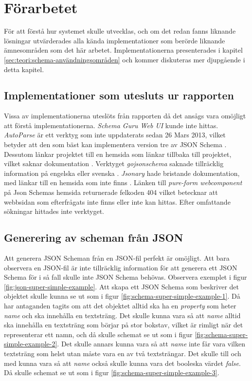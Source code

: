 \chapter{Förarbetet}
\label{sec:forarbete}
För att förstå hur systemet skulle utvecklas, och om det redan fanns liknande lösningar utvärderades alla kända implementationer som berörde liknande ämnesområden som det här arbetet. Implementationerna presenterades i kapitel \ref{sec:teori:schema-användningsområden} och kommer diskuteras mer djupgående i detta kapitel.

\section{Implementationer som utesluts ur rapporten}
Vissa av implementationerna uteslöts från rapporten då det ansågs vara omöjligt att förstå implementationerna. \textit{Schema Guru Web UI} kunde inte hittas. \textit{AutoParse} är ett verktyg som inte uppdaterats sedan 26 Mars 2013, vilket betyder att den som bäst kan implementera version tre av JSON Schema \cite{Googleb}. Dessutom länkar projektet till en hemsida som länkar tillbaka till projektet, vilket saknar dokumentation \cite{Googleb}. Verktyget \textit{gojsonschema} saknade tillräcklig information på engelska eller svenska \cite{Zhangtao}. \textit{Jsonary} hade bristande dokumentation, med länkar till en hemsida som inte finns \cite{Jsonary-js}. Länken till \textit{pure-form webcomponent} på Json Schemas hemsida returnerade felkoden 404 vilket betecknar att webbsidan som efterfrågats inte finns eller inte kan hittas. Efter omfattande sökningar hittades inte verktyget.

\section{Generering av scheman från JSON}
\label{sec:forarbete:json-till-schema}
Att generera JSON Scheman från en JSON-fil perfekt är omöjligt. Att bara observera en JSON-fil är inte tillräcklig information för att generera ett JSON Schema för i så fall skulle inte JSON Schema behövas. Observera exemplet i figur \ref{fig:json-super-simple-example}. Att skapa ett JSON Schema som beskriver det objektet skulle kunna se ut som i figur \ref{fig:schema-super-simple-example-1}. Då har antaganden tagits om att det objektet alltid ska ha en \textit{property} som heter \textit{name} och ska innehålla en textsträng. Det skulle kunna vara så att \textit{name} alltid ska innehålla en textsträng som börjar på stor bokstav, vilket är rimligt när det representerar ett namn, och då skulle schemat se ut som i figur \ref{fig:schema-super-simple-example-2}. Det skulle annars kunna vara så att \textit{name} inte får vara vilken textsträng som helst utan måste vara en av två textsträngar. Det skulle till och med kunna vara så att \textit{name} också skulle kunna vara det booleska värdet \textit{false}. Då skulle schemat se ut som i figur \ref{fig:schema-super-simple-example-3}.


